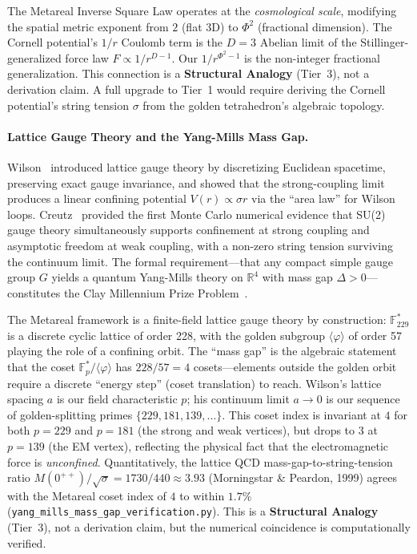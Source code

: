 The Metareal Inverse Square Law operates at the \emph{cosmological scale}, modifying the spatial metric exponent from $2$ (flat 3D) to $\Phi^2$ (fractional dimension). The Cornell potential's $1/r$ Coulomb term is the $D = 3$ Abelian limit of the Stillinger-generalized force law $F \propto 1/r^{D-1}$. Our $1/r^{\Phi^2 - 1}$ is the non-integer fractional generalization. This connection is a \textbf{Structural Analogy} (Tier~3), not a derivation claim. A full upgrade to Tier~1 would require deriving the Cornell potential's string tension $\sigma$ from the golden tetrahedron's algebraic topology.

\paragraph{Lattice Gauge Theory and the Yang-Mills Mass Gap.}
Wilson~\cite{wilson1974} introduced lattice gauge theory by discretizing Euclidean spacetime, preserving exact gauge invariance, and showed that the strong-coupling limit produces a linear confining potential $V(r) \propto \sigma r$ via the ``area law'' for Wilson loops. Creutz~\cite{creutz1980} provided the first Monte Carlo numerical evidence that SU(2) gauge theory simultaneously supports confinement at strong coupling and asymptotic freedom at weak coupling, with a non-zero string tension surviving the continuum limit. The formal requirement---that any compact simple gauge group $G$ yields a quantum Yang-Mills theory on $\mathbb{R}^4$ with mass gap $\Delta > 0$---constitutes the Clay Millennium Prize Problem~\cite{jaffe2000}.

The Metareal framework is a finite-field lattice gauge theory by construction: $\mathbb{F}_{229}^*$ is a discrete cyclic lattice of order 228, with the golden subgroup $\langle\varphi\rangle$ of order 57 playing the role of a confining orbit. The ``mass gap'' is the algebraic statement that the coset $\mathbb{F}_p^* / \langle\varphi\rangle$ has $228/57 = 4$ cosets---elements outside the golden orbit require a discrete ``energy step'' (coset translation) to reach. Wilson's lattice spacing $a$ is our field characteristic $p$; his continuum limit $a \to 0$ is our sequence of golden-splitting primes $\{229, 181, 139, \ldots\}$. This coset index is invariant at $4$ for both $p=229$ and $p=181$ (the strong and weak vertices), but drops to $3$ at $p=139$ (the EM vertex), reflecting the physical fact that the electromagnetic force is \emph{unconfined}. Quantitatively, the lattice QCD mass-gap-to-string-tension ratio $M(0^{++})/\sqrt{\sigma} = 1730/440 \approx 3.93$ (Morningstar \& Peardon, 1999) agrees with the Metareal coset index of $4$ to within $1.7\%$ (\texttt{yang\_mills\_mass\_gap\_verification.py}). This is a \textbf{Structural Analogy} (Tier~3), not a derivation claim, but the numerical coincidence is computationally verified.

